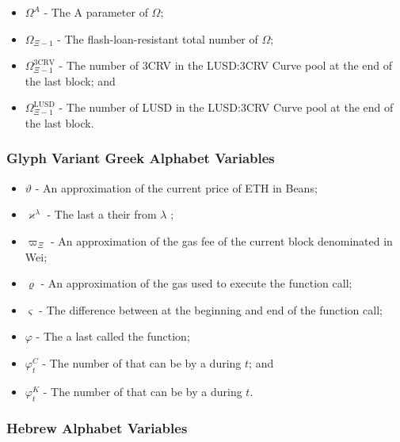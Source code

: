 \documentclass[class=article, crop=false]{standalone}
\begin{document}
\begin{itemize}[topsep=0pt, itemsep=3pt,leftmargin=16pt]
    \item[] $\Omega^{A}$ - \hypertarget{ht238}{The A parameter of $\Omega$};
    \item[] $\Omega_{\Xi-1}$ - \hypertarget{ht239}{The flash-loan-resistant total number of $\Omega$};
    \item[] $\Omega_{\Xi-1}^{\text{3CRV}}$ - \hypertarget{ht240}{The number of 3CRV in the LUSD:3CRV Curve pool at the end of the last block}; and
    \item[] $\Omega_{\Xi-1}^{\text{LUSD}}$ - \hypertarget{ht241}{The number of LUSD in the LUSD:3CRV Curve pool at the end of the last block}.
\end{itemize}

\subsubsection{Glyph Variant Greek Alphabet Variables}

\begin{itemize}[topsep=0pt, itemsep=3pt,leftmargin=16pt]
    \item[] $\vartheta$ - An approximation of the current price of ETH in Beans;
    \item[] $\varkappa^{\lambda}$ - \hypertarget{ht122}{The last  a   their  from \hyperlink{ht126}{$\lambda$} };
    \item[] $\varpi_\Xi$ - An approximation of the gas fee of the current block denominated in Wei;
    \item[] $\varrho$ - An approximation of the gas used to execute the  function call;
    \item[] $\varsigma$ - The difference between  at the beginning and end of the  function call;
    \item[] $\varphi$ - \hypertarget{ht201}{The  a  last called the  function};
    \item[] ${\varphi}_t^C$ - \hypertarget{ht202}{The number of  that can be  by a  during $t$}; and
    \item[] ${\varphi}_t^K$ - \hypertarget{ht203}{The number of  that can be  by a  during $t$}.
\end{itemize}

\subsubsection{Hebrew Alphabet Variables}
\end{document}
